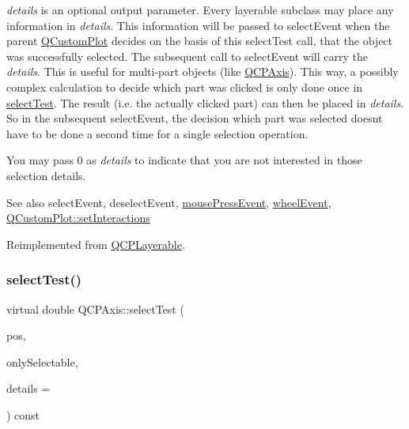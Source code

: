 {\itshape details} is an optional output parameter. Every layerable subclass may place any information in {\itshape details}. This information will be passed to select\+Event when the parent \hyperlink{class_q_custom_plot}{Q\+Custom\+Plot} decides on the basis of this select\+Test call, that the object was successfully selected. The subsequent call to select\+Event will carry the {\itshape details}. This is useful for multi-\/part objects (like \hyperlink{class_q_c_p_axis}{Q\+C\+P\+Axis}). This way, a possibly complex calculation to decide which part was clicked is only done once in \hyperlink{class_q_c_p_axis_a63b7103c57fe9acfbce164334ea837f8}{select\+Test}. The result (i.\+e. the actually clicked part) can then be placed in {\itshape details}. So in the subsequent select\+Event, the decision which part was selected doesn\textquotesingle{}t have to be done a second time for a single selection operation.

You may pass 0 as {\itshape details} to indicate that you are not interested in those selection details.

\begin{DoxySeeAlso}{See also}
select\+Event, deselect\+Event, \hyperlink{class_q_c_p_layerable_af6567604818db90f4fd52822f8bc8376}{mouse\+Press\+Event}, \hyperlink{class_q_c_p_layerable_a47dfd7b8fd99c08ca54e09c362b6f022}{wheel\+Event}, \hyperlink{class_q_custom_plot_a5ee1e2f6ae27419deca53e75907c27e5}{Q\+Custom\+Plot\+::set\+Interactions} 
\end{DoxySeeAlso}


Reimplemented from \hyperlink{class_q_c_p_layerable_a04db8351fefd44cfdb77958e75c6288e}{Q\+C\+P\+Layerable}.

\mbox{\label{class_q_c_p_axis_ad5db8e8f406fa52621d6cb7b35b9d63c}} 
\subsubsection{\texorpdfstring{select\+Test()}{selectTest()}\hspace{0.1cm}{\footnotesize\ttfamily [2/2]}}
{\footnotesize\ttfamily virtual double Q\+C\+P\+Axis\+::select\+Test (\begin{DoxyParamCaption}\item[{const Q\+PointF \&}]{pos,  }\item[{bool}]{only\+Selectable,  }\item[{Q\+Variant $\ast$}]{details = {} }\end{DoxyParamCaption}) const\hspace{0.3cm}{\ttfamily [virtual]}}

